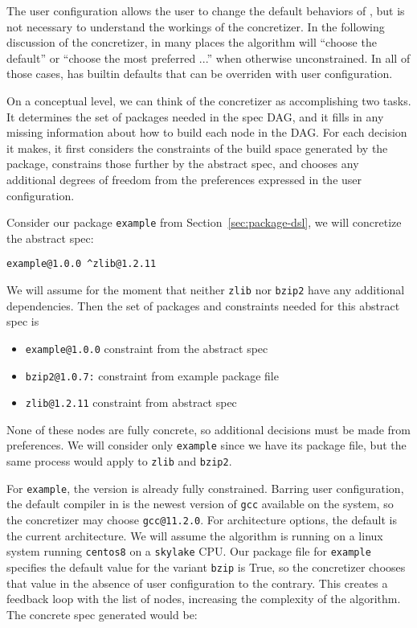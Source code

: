 The user configuration allows the user to change the default behaviors of \spack, but is not necessary to understand the workings of the concretizer. In the following discussion of the concretizer, in many places the algorithm will ``choose the default'' or ``choose the most preferred ...'' when otherwise unconstrained. In all of those cases, \spack has builtin defaults that can be overriden with user configuration.

On a conceptual level, we can think of the concretizer as accomplishing two tasks. It determines the set of packages needed in the spec DAG, and it fills in any missing information about how to build each node in the DAG. For each decision it makes, it first considers the constraints of the build space generated by the package, constrains those further by the abstract spec, and chooses any additional degrees of freedom from the preferences expressed in the user configuration.

Consider our package \texttt{example} from Section~\ref{sec:package-dsl}, we will concretize the abstract spec:
\begin{verbatim}
example@1.0.0 ^zlib@1.2.11
\end{verbatim}
We will assume for the moment that neither \texttt{zlib} nor \texttt{bzip2} have any additional dependencies. Then the set of packages and constraints needed for this abstract spec is

\begin{itemize}
\item \texttt{example@1.0.0} constraint from the abstract spec \\
\item \texttt{bzip2@1.0.7:} constraint from example package file \\
\item \texttt{zlib@1.2.11} constraint from abstract spec \\
\end{itemize}

None of these nodes are fully concrete, so additional decisions must be made from preferences.
We will consider only \texttt{example} since we have its package file, but the same process would apply to \texttt{zlib} and \texttt{bzip2}.

For \texttt{example}, the version is already fully constrained.
Barring user configuration, the default compiler in \spack is the newest version of \texttt{gcc} available on the system, so the concretizer may choose \texttt{gcc@11.2.0}.
For architecture options, the default is the current architecture. We will assume the algorithm is running on a linux system running \texttt{centos8} on a \texttt{skylake} CPU.
Our package file for \texttt{example} specifies the default value for the variant \texttt{bzip} is True, so the concretizer chooses that value in the absence of user configuration to the contrary.
This creates a feedback loop with the list of nodes, increasing the complexity of the algorithm.
The concrete spec generated would be:

